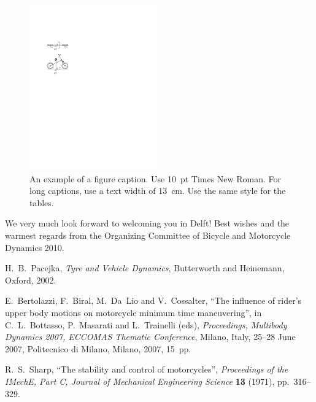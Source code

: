 \documentclass{bmd2010a}
\begin{document}
\begin{figure}[h!]
\begin{center}
  \includegraphics[width=55mm]{figure1}
  \caption{An example of a figure caption. Use 10~pt Times New Roman.
           For long captions, use a text width of 13~cm.
           Use the same style for the tables.} \label{fig:fig1}
\end{center}
\end{figure}


We very much look forward to welcoming you in Delft! Best wishes and the warmest regards from the Organizing Committee of Bicycle and Motorcycle Dynamics 2010.


% 
% 
\begin{thebibliography}{6}
 H.~B.~Pacejka,
\textit{Tyre and Vehicle Dynamics},
Butterworth and Heinemann, Oxford, 2002.

 E.~Bertolazzi, F.~Biral, M.~Da~Lio and V.~Cossalter,
``The influence of rider's upper body motions on motorcycle minimum time
  maneuvering'',
in C.~L.~Bottasso, P.~Masarati and L.~Trainelli (eds),
\textit{Proceedings, Multibody Dynamics 2007, ECCOMAS Thematic Conference},
Milano, Italy, 25--28 June 2007,
Politecnico di Milano, Milano, 2007, 15~pp.

 R.~S.~Sharp,
``The stability and control of motorcycles'',
\textit{Proceedings of the IMechE, Part C, Journal of Mechanical Engineering
  Science} \textbf{13} (1971), pp.~316--329.

\end{thebibliography}
\end{document}
